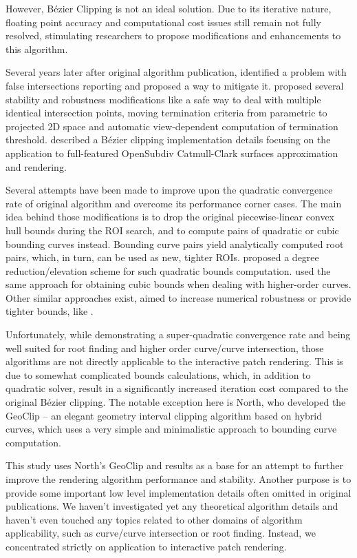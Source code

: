 \documentclass{jcgt}
\begin{document}
However, Bézier Clipping is not an ideal solution. Due to its iterative nature, floating point accuracy and computational cost issues still remain not fully resolved, stimulating researchers to propose modifications and enhancements to this algorithm.

Several years later after original algorithm publication, \cite{CAMPAGNA97} identified a problem with false intersections reporting and proposed a way to mitigate it. \cite{EFREMOV05} proposed several stability and robustness modifications like a safe way to deal with multiple identical intersection points, moving termination criteria from parametric to projected 2D space and automatic view-dependent computation of termination threshold. \cite{Tejima2015subdivision} described a Bézier clipping implementation details focusing on the application to full-featured OpenSubdiv\cite{OpenSubdiv} Catmull-Clark surfaces approximation and rendering.

Several attempts have been made to improve upon the quadratic convergence rate of original algorithm and overcome its performance corner cases. The main idea behind those modifications is to drop the original piecewise-linear convex hull bounds during the ROI search, and to compute pairs of quadratic or cubic bounding curves instead. Bounding curve pairs yield analytically computed root pairs, which, in turn, can be used as new, tighter ROIs. \cite{BARTON2007125} proposed a degree reduction/elevation scheme for such quadratic bounds computation. \cite{LIU2009547} used the same approach for obtaining cubic bounds when dealing with higher-order curves. Other similar approaches exist, aimed to increase numerical robustness or provide tighter bounds, like \cite{WuLi22}.

Unfortunately, while demonstrating a super-quadratic convergence rate and being well suited for root finding and higher order curve/curve intersection, those algorithms are not directly applicable to the interactive patch rendering. This is due to somewhat complicated bounds calculations, which, in addition to quadratic solver, result in a significantly increased iteration cost compared to the original Bézier clipping. The notable exception here is North\cite{NORTH07}, who developed the GeoClip – an elegant geometry interval clipping algorithm based on hybrid curves, which uses a very simple and minimalistic approach to bounding curve computation.

This study uses North’s GeoClip\cite{NORTH07} and \cite{EFREMOV05} results as a base for an attempt to further improve the rendering algorithm performance and stability. Another purpose is to provide some important low level implementation details often omitted in original publications. We haven't investigated yet any theoretical algorithm details and haven't even touched any topics related to other domains of algorithm applicability, such as curve/curve intersection or root finding. Instead, we concentrated strictly on application to interactive patch rendering.
\end{document}
